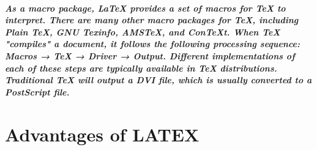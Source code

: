 \documentclass[11pt]{report}
\begin{document}
\paragraph{As a macro package, LaTeX provides a set of macros for TeX to interpret. There are many other macro packages for TeX, including Plain TeX, GNU Texinfo, AMSTeX, and ConTeXt. When TeX "compiles" a document, it follows the following processing sequence: Macros → TeX → Driver → Output. Different implementations of each of these steps are typically available in TeX distributions. Traditional TeX will output a DVI file, which is usually converted to a PostScript file.}
\clearpage
\setcounter{page}{3}
\chapter{Advantages of LATEX} 
\end{document}
